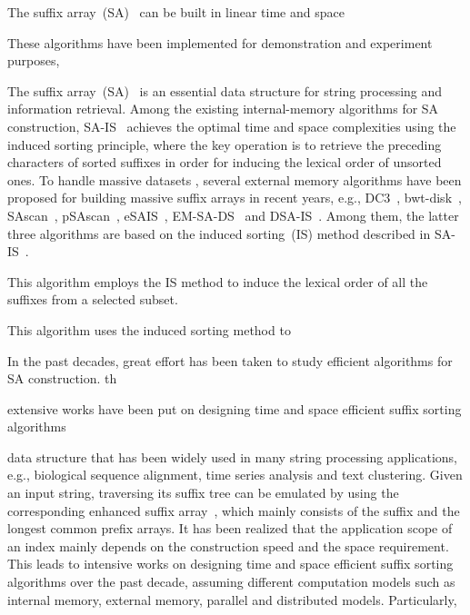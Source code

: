 \documentclass[10pt,journal,compsoc]{IEEEtran}
\begin{document}
The suffix array~(SA)~\cite{Manber1993} can be built in linear time and space 

These algorithms have been implemented for demonstration and experiment purposes, 


The suffix array~(SA)~\cite{Manber1993} is an essential data structure for string processing and information retrieval. Among the existing internal-memory algorithms for SA construction, SA-IS~\cite{Nong11} achieves the optimal time and space complexities using the induced sorting principle, where the key operation is to retrieve the preceding characters of sorted suffixes in order for inducing the lexical order of unsorted ones. To handle massive datasets , several external memory algorithms have been proposed for building massive suffix arrays in recent years, e.g., DC3~\cite{Dementiev2008a}, bwt-disk~\cite{Ferragina2012}, SAscan~\cite{Karkkainen2014}, pSAscan~\cite{Karkkainen2015}, eSAIS~\cite{Bingmann2013}, EM-SA-DS~\cite{Nong2014} and DSA-IS~\cite{Nong2015}. Among them, the latter three algorithms are based on the induced sorting~(IS) method described in SA-IS~\cite{Nong2011}.


 This algorithm employs the IS method to induce the lexical order of all the suffixes from a selected subset. 

 This algorithm uses the induced sorting method to 

In the past decades, great effort has been taken to study efficient algorithms for SA construction. th

extensive works have been put on designing time and space efficient suffix sorting algorithms

data structure that has been widely used in many string processing applications, e.g., biological sequence alignment, time series analysis and text clustering. Given an input string, traversing its suffix tree can be emulated by using the corresponding enhanced suffix array~\cite{Abouelhodaa2004}, which mainly consists of the suffix and the longest common prefix arrays. It has been realized that the application scope of an index mainly depends on the construction speed and the space requirement. This leads to intensive works on designing time and space efficient suffix sorting algorithms over the past decade, assuming different computation models such as internal memory, external memory, parallel and distributed models. Particularly, 
\end{document}

